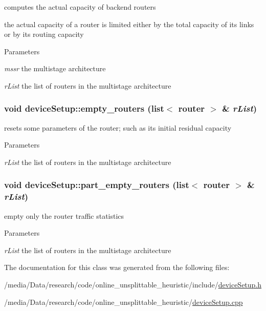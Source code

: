 computes the actual capacity of backend routers 

the actual capacity of a router is limited either by the total capacity of its links or by its routing capacity 
\begin{DoxyParams}{Parameters}
\item[{\em mssr}]the multistage architecture \item[{\em rList}]the list of routers in the multistage architecture \end{DoxyParams}
\hypertarget{classdeviceSetup_a89cb8151a7b9153ea09fcfc52260bb9b}{
\subsubsection[{empty\_\-routers}]{\setlength{\rightskip}{0pt plus 5cm}void deviceSetup::empty\_\-routers (list$<$ {\bf router} $>$ \& {\em rList})}}
\label{classdeviceSetup_a89cb8151a7b9153ea09fcfc52260bb9b}


resets some parameters of the router; such as its initial residual capacity 


\begin{DoxyParams}{Parameters}
\item[{\em rList}]the list of routers in the multistage architecture \end{DoxyParams}
\hypertarget{classdeviceSetup_a5570f97a50fe149a89b9f62500932cec}{
\subsubsection[{part\_\-empty\_\-routers}]{\setlength{\rightskip}{0pt plus 5cm}void deviceSetup::part\_\-empty\_\-routers (list$<$ {\bf router} $>$ \& {\em rList})}}
\label{classdeviceSetup_a5570f97a50fe149a89b9f62500932cec}


empty only the router traffic statistics 


\begin{DoxyParams}{Parameters}
\item[{\em rList}]the list of routers in the multistage architecture \end{DoxyParams}


The documentation for this class was generated from the following files:\begin{DoxyCompactItemize}
\item 
/media/Data/research/code/online\_\-unsplittable\_\-heuristic/include/\hyperlink{deviceSetup_8h}{deviceSetup.h}\item 
/media/Data/research/code/online\_\-unsplittable\_\-heuristic/\hyperlink{deviceSetup_8cpp}{deviceSetup.cpp}\end{DoxyCompactItemize}
